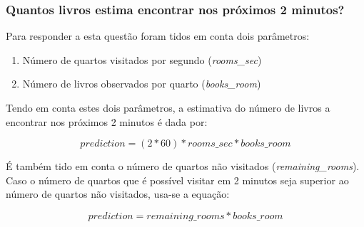 \subsubsection{Quantos livros estima encontrar nos próximos 2 minutos?}
\label{chap2:subsec:q7}

Para responder a esta questão foram tidos em conta dois parâmetros:

\begin{enumerate}
    \item Número de quartos visitados por segundo (\textit{rooms\_sec})
    \item Número de livros observados por quarto (\textit{books\_room})
\end{enumerate}

Tendo em conta estes dois parâmetros, a estimativa do número de livros a encontrar nos próximos 2 minutos é dada por:

\begin{equation}
    prediction = (2 * 60) * rooms\_sec * books\_room
\end{equation}

É também tido em conta o número de quartos não visitados (\textit{remaining\_rooms}). Caso o número de quartos que é possível visitar em 2 minutos seja superior ao número de quartos não visitados, usa-se a equação:

\begin{equation}
    prediction = remaining\_rooms * books\_room
\end{equation}

